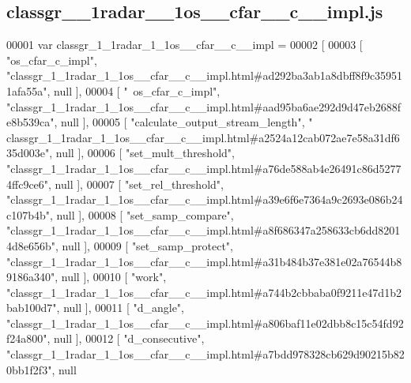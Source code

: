 \subsection{classgr\+\_\+\_\+1radar\+\_\+\_\+1os\+\_\+\+\_\+cfar\+\_\+\+\_\+c\+\_\+\+\_\+impl.\+js}
\label{classgr__1__1radar__1__1os____cfar____c____impl_8js_source}

\begin{DoxyCode}
00001 var classgr_1_1radar_1_1os__cfar__c__impl =
00002 [
00003     [ \textcolor{stringliteral}{"os\_cfar\_c\_impl"}, \textcolor{stringliteral}{"classgr\_1\_1radar\_1\_1os\_\_cfar\_\_c\_\_impl.html#ad292ba3ab1a8dbff8f9c359511afa55a"}, 
      null ],
00004     [ \textcolor{stringliteral}{"~os\_cfar\_c\_impl"}, \textcolor{stringliteral}{"classgr\_1\_1radar\_1\_1os\_\_cfar\_\_c\_\_impl.html#aad95ba6ae292d9d47eb2688fe8b539ca"}, 
      null ],
00005     [ \textcolor{stringliteral}{"calculate\_output\_stream\_length"}, \textcolor{stringliteral}{"
      classgr\_1\_1radar\_1\_1os\_\_cfar\_\_c\_\_impl.html#a2524a12cab072ae7e58a31df635d003e"}, null ],
00006     [ \textcolor{stringliteral}{"set\_mult\_threshold"}, \textcolor{stringliteral}{"classgr\_1\_1radar\_1\_1os\_\_cfar\_\_c\_\_impl.html#a76de588ab4e26491c86d52774ffc9ce6"},
       null ],
00007     [ \textcolor{stringliteral}{"set\_rel\_threshold"}, \textcolor{stringliteral}{"classgr\_1\_1radar\_1\_1os\_\_cfar\_\_c\_\_impl.html#a39e6f6e7364a9c2693e086b24c107b4b"}, 
      null ],
00008     [ \textcolor{stringliteral}{"set\_samp\_compare"}, \textcolor{stringliteral}{"classgr\_1\_1radar\_1\_1os\_\_cfar\_\_c\_\_impl.html#a8f686347a258633cb6dd82014d8e656b"}, 
      null ],
00009     [ \textcolor{stringliteral}{"set\_samp\_protect"}, \textcolor{stringliteral}{"classgr\_1\_1radar\_1\_1os\_\_cfar\_\_c\_\_impl.html#a31b484b37e381e02a76544b89186a340"}, 
      null ],
00010     [ \textcolor{stringliteral}{"work"}, \textcolor{stringliteral}{"classgr\_1\_1radar\_1\_1os\_\_cfar\_\_c\_\_impl.html#a744b2cbbaba0f9211e47d1b2bab100d7"}, null ],
00011     [ \textcolor{stringliteral}{"d\_angle"}, \textcolor{stringliteral}{"classgr\_1\_1radar\_1\_1os\_\_cfar\_\_c\_\_impl.html#a806baf11e02dbb8c15c54fd92f24a800"}, null ],
00012     [ \textcolor{stringliteral}{"d\_consecutive"}, \textcolor{stringliteral}{"classgr\_1\_1radar\_1\_1os\_\_cfar\_\_c\_\_impl.html#a7bdd978328cb629d90215b820bb1f2f3"}, null

\end{DoxyCode}
